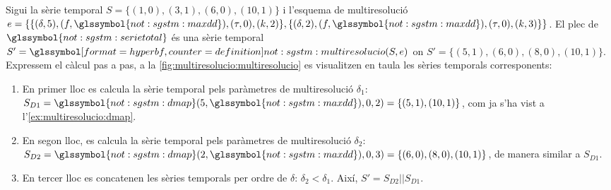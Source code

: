 \begin{example}
  Sigui la sèrie temporal $S=\{(1,0),(3,1),(6,0),(10,1)\}$ i l'esquema
  de multiresolució
  $e=\{\{(\delta,5),(f,\glssymbol{not:sgstm:maxdd}),(\tau,0),(k,2)\},
  \{(\delta,2),(f,\glssymbol{not:sgstm:maxdd}),(\tau,0),(k,3)\}\}$.
  El plec de $\glssymbol{not:sgstm:serietotal}$ és una sèrie temporal
  $S'= \glssymboldef{not:sgstm:multiresolucio}(S,e)$ on
  $S'=\{(5,1),(6,0),(8,0),(10,1)\}$. Expressem el càlcul pas a pas, a la
  \autoref{fig:multiresolucio:multiresolucio} es visualitzen en taula les sèries
  temporals corresponents:

  \begin{enumerate}
  \item En primer lloc es calcula la sèrie temporal pels paràmetres de
    multiresolució $\delta_1$:
    $S_{D1}=\glssymbol{not:sgstm:dmap}(5,\glssymbol{not:sgstm:maxdd}),0,2)=\{(5,1),(10,1)\}$,
    com ja s'ha vist a l'\autoref{ex:multiresolucio:dmap}.

  \item En segon lloc, es calcula la sèrie temporal pels paràmetres de
    multiresolució $\delta_2$:
    $S_{D2}=\glssymbol{not:sgstm:dmap}(2,\glssymbol{not:sgstm:maxdd}),0,3)=\{(6,0),(8,0),(10,1)\}$,
    de manera similar a $S_{D1}$.

  \item En tercer lloc es concatenen les sèries temporals per ordre de
    $\delta$: $\delta_2<\delta_1$. Així, $S'= S_{D2} || S_{D1}$.

  \end{enumerate}
  



\end{example}
